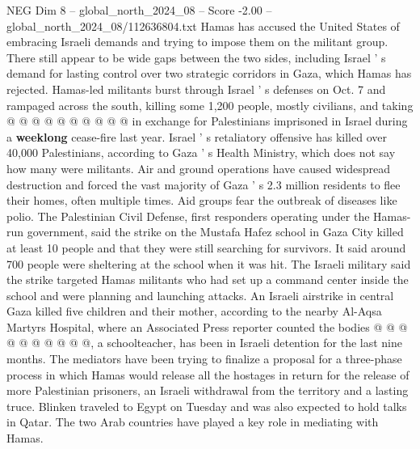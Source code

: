 \begin{textsample}{NEG Dim 8 – global\_north\_2024\_08 – Score -2.00 – global\_north\_2024\_08/112636804.txt}
Hamas has accused the United States of embracing Israeli demands and trying to impose them on the militant group.
There still appear to be wide gaps between the two sides, including Israel ' s demand for lasting control over two strategic corridors in Gaza, which Hamas has rejected.
Hamas-led militants burst through Israel ' s defenses on Oct. 7 and rampaged across the south, killing some 1,200 people, mostly civilians, and taking @ @ @ @ @ @ @ @ @ @ in exchange for Palestinians imprisoned in Israel during a \textbf{weeklong} cease-fire last year.
Israel ' s retaliatory offensive has killed over 40,000 Palestinians, according to Gaza ' s Health Ministry, which does not say how many were militants.
Air and ground operations have caused widespread destruction and forced the vast majority of Gaza ' s 2.3 million residents to flee their homes, often multiple times.
Aid groups fear the outbreak of diseases like polio.
The Palestinian Civil Defense, first responders operating under the Hamas-run government, said the strike on the Mustafa Hafez school in Gaza City killed at least 10 people and that they were still searching for survivors.
It said around 700 people were sheltering at the school when it was hit.
The Israeli military said the strike targeted Hamas militants who had set up a command center inside the school and were planning and launching attacks.
An Israeli airstrike in central Gaza killed five children and their mother, according to the nearby Al-Aqsa Martyrs Hospital, where an Associated Press reporter counted the bodies @ @ @ @ @ @ @ @ @ @, a schoolteacher, has been in Israeli detention for the last nine months.
The mediators have been trying to finalize a proposal for a three-phase process in which Hamas would release all the hostages in return for the release of more Palestinian prisoners, an Israeli withdrawal from the territory and a lasting truce.
Blinken traveled to Egypt on Tuesday and was also expected to hold talks in Qatar.
The two Arab countries have played a key role in mediating with Hamas.

\end{textsample}
